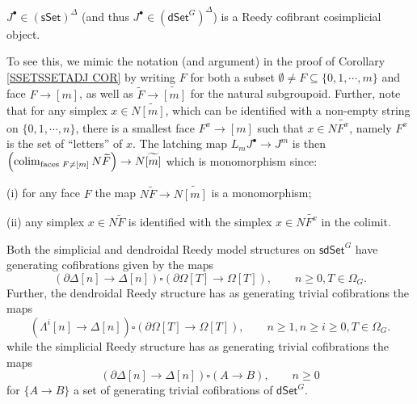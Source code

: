 \documentclass[a4paper,10pt
 ,draft
]{article}%
\begin{document}
\begin{remark}\label{JREEDYCOF REM}
$J^{\bullet} \in \left(\mathsf{sSet}\right)^{\Delta}$ 
(and thus $J^{\bullet} \in \left(\mathsf{dSet}^G\right)^{\Delta}$) is a Reedy cofibrant cosimplicial object. 

To see this, we mimic the notation (and argument) in the proof of
Corollary \ref{SSETSSETADJ COR} by writing 
$F$ for both a subset $\emptyset \neq F \subseteq \{0,1,\cdots,m\}$
and face $F \to [m]$, as well as $\widetilde{F} \to \widetilde{[m]}$ for the natural subgroupoid.
Further, note that for any simplex $x \in N\widetilde{[m]}$, which can be identified with a non-empty string on $\{0,1,\cdots,n\}$, there is a smallest face $F^x \to [m]$ such that 
$x \in N\widetilde{F^x}$, namely $F^x$ is the set of ``letters'' of $x$.
The latching map $L_m J^{\bullet} \to J^m$ is then
$
\left(\mathop{\operatorname{colim}}_{\text{faces }F \neq [m]} N \widetilde{F}\right) \to N\widetilde{[m]}
$
which is monomorphism since:
\begin{inparaenum}
	\item[(i)] for any face $F$ the map $N \widetilde{F} \to N\widetilde{[m]}$ is a monomorphism;
	\item[(ii)] any simplex $x \in N \widetilde{F}$ is identified with the simplex $x \in N \widetilde{F^x}$ in the colimit.
\end{inparaenum}
\end{remark}


\begin{proposition}
      \label{SDSETJRCOF PROP}
	Both the simplicial and dendroidal Reedy model structures on 
	$\mathsf{sdSet}^G$ have generating cofibrations given by the maps
\begin{equation}\label{JOINTCOF EQ}
	\left(\partial \Delta [n] \to \Delta[n]\right)
		\square
	\left(\partial \Omega[T] \to \Omega[T]\right),
	\qquad
	n\geq 0, T \in \Omega_G.
\end{equation}
  Further, the dendroidal Reedy structure has as generating trivial cofibrations the maps
\begin{equation}\label{DENDTRIVCOF EQ}
	\left(\Lambda^i [n] \to \Delta[n]\right)
		\square
	\left(\partial \Omega[T] \to \Omega[T]\right),
	\qquad
 	n\geq 1, n\geq i \geq 0, T \in \Omega_G.
\end{equation}
while the simplicial Reedy structure has as generating trivial cofibrations the maps
\begin{equation}\label{SIMPTRIVCOF EQ}
	\left(\partial \Delta [n] \to \Delta[n]\right)
		\square
	\left(A \to B\right),
	\qquad
	n\geq 0
\end{equation}
for $\{A \to B\}$ a set of generating trivial cofibrations of
$\mathsf{dSet}^G$.
\end{proposition}
\end{document}
